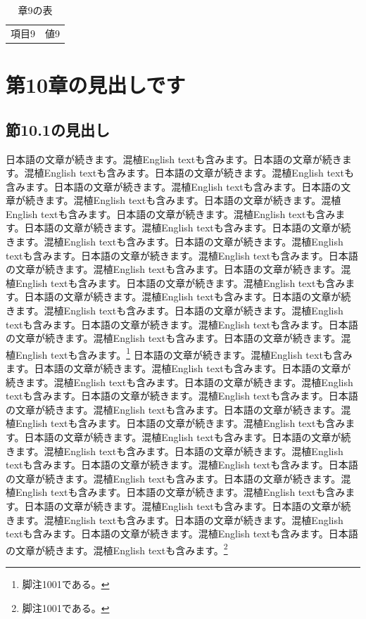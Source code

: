 \documentclass[pdflatex,book]{jlreq}
\begin{document}
\begin{table}[htbp]\centering\caption{章9の表}\begin{tabular}{cc}項目9 & 値9\\\end{tabular}\end{table}

\chapter{第10章の見出しです}
\section{節10.1の見出し}
日本語の文章が続きます。混植English textも含みます。日本語の文章が続きます。混植English textも含みます。日本語の文章が続きます。混植English textも含みます。日本語の文章が続きます。混植English textも含みます。日本語の文章が続きます。混植English textも含みます。日本語の文章が続きます。混植English textも含みます。日本語の文章が続きます。混植English textも含みます。日本語の文章が続きます。混植English textも含みます。日本語の文章が続きます。混植English textも含みます。日本語の文章が続きます。混植English textも含みます。日本語の文章が続きます。混植English textも含みます。日本語の文章が続きます。混植English textも含みます。日本語の文章が続きます。混植English textも含みます。日本語の文章が続きます。混植English textも含みます。日本語の文章が続きます。混植English textも含みます。日本語の文章が続きます。混植English textも含みます。日本語の文章が続きます。混植English textも含みます。日本語の文章が続きます。混植English textも含みます。日本語の文章が続きます。混植English textも含みます。日本語の文章が続きます。混植English textも含みます。\footnote{脚注1001である。}
日本語の文章が続きます。混植English textも含みます。日本語の文章が続きます。混植English textも含みます。日本語の文章が続きます。混植English textも含みます。日本語の文章が続きます。混植English textも含みます。日本語の文章が続きます。混植English textも含みます。日本語の文章が続きます。混植English textも含みます。日本語の文章が続きます。混植English textも含みます。日本語の文章が続きます。混植English textも含みます。日本語の文章が続きます。混植English textも含みます。日本語の文章が続きます。混植English textも含みます。日本語の文章が続きます。混植English textも含みます。日本語の文章が続きます。混植English textも含みます。日本語の文章が続きます。混植English textも含みます。日本語の文章が続きます。混植English textも含みます。日本語の文章が続きます。混植English textも含みます。日本語の文章が続きます。混植English textも含みます。日本語の文章が続きます。混植English textも含みます。日本語の文章が続きます。混植English textも含みます。日本語の文章が続きます。混植English textも含みます。日本語の文章が続きます。混植English textも含みます。\footnote{脚注1001である。}
\end{document}
